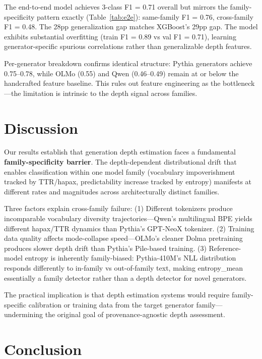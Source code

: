 \documentclass[11pt,a4paper]{article}
\begin{document}
The end-to-end model achieves 3-class F1 = 0.71 overall but mirrors the family-specificity pattern exactly (Table~\ref{tab:e2e}): same-family F1 = 0.76, cross-family F1 = 0.48.
The 28pp generalization gap matches XGBoost's 29pp gap.
The model exhibits substantial overfitting (train F1 = 0.89 vs val F1 = 0.71), learning generator-specific spurious correlations rather than generalizable depth features.

Per-generator breakdown confirms identical structure: Pythia generators achieve 0.75--0.78, while OLMo (0.55) and Qwen (0.46--0.49) remain at or below the handcrafted feature baseline.
This rules out feature engineering as the bottleneck---the limitation is intrinsic to the depth signal across families.

\section{Discussion}

Our results establish that generation depth estimation faces a fundamental \textbf{family-specificity barrier}.
The depth-dependent distributional drift that enables classification within one model family (vocabulary impoverishment tracked by TTR/hapax, predictability increase tracked by entropy) manifests at different rates and magnitudes across architecturally distinct families.

Three factors explain cross-family failure:
(1) Different tokenizers produce incomparable vocabulary diversity trajectories---Qwen's multilingual BPE yields different hapax/TTR dynamics than Pythia's GPT-NeoX tokenizer.
(2) Training data quality affects mode-collapse speed---OLMo's cleaner Dolma pretraining produces slower depth drift than Pythia's Pile-based training.
(3) Reference-model entropy is inherently family-biased: Pythia-410M's NLL distribution responds differently to in-family vs out-of-family text, making entropy\_mean essentially a family detector rather than a depth detector for novel generators.

The practical implication is that depth estimation systems would require family-specific calibration or training data from the target generator family---undermining the original goal of provenance-agnostic depth assessment.

\section{Conclusion}
\end{document}
